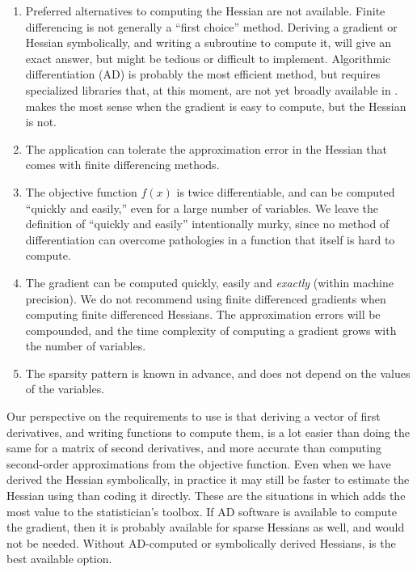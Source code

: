 \documentclass[article]{jss}\usepackage[]{graphicx}\usepackage[]{color}
\begin{document}
\begin{enumerate}
  \item Preferred alternatives to computing the Hessian are not
  available.  Finite differencing is not generally a ``first choice''
  method.  Deriving a gradient or Hessian symbolically, and writing a
  subroutine to compute it, will give an exact answer, but might be
  tedious or difficult to implement. Algorithmic differentiation (AD) is
  probably the most efficient method, but requires specialized
  libraries that, at this moment, are not yet broadly available in .
  makes the most sense when the gradient is easy to compute, but the Hessian is
  not.
  \item The application can tolerate the approximation error in the Hessian
  that comes with finite differencing methods.
\item The objective function $f(x)$ is twice differentiable, and can be
  computed ``quickly and easily,'' even for a large number of
  variables.  We leave the definition of ``quickly and easily''
  intentionally murky, since no method of differentiation can overcome
  pathologies in a function that itself is hard to compute.
\item The gradient can
  be computed quickly, easily and \emph{exactly} (within machine
  precision).   We do not recommend using finite differenced gradients
  when computing finite differenced Hessians.  The
  approximation errors will be compounded, and the time
  complexity of computing a gradient grows with the number of
  variables.
\item The sparsity pattern is known in advance, and does not depend
    on the values of the variables.
\end{enumerate}

Our perspective on the requirements to use  is
that deriving a vector of first
derivatives, and writing  functions to compute them, is a
lot easier than doing the same for a matrix of second derivatives, and
more accurate than computing second-order approximations from the
objective function. Even when we have derived the Hessian symbolically, in practice it may still be faster to estimate the Hessian
using  than coding it directly.   These are the
situations in which  adds the most value to the
statistician's toolbox.  If AD software is available to compute the gradient, then
it is probably available for sparse Hessians as well, and
 would not be needed.  Without AD-computed or
symbolically derived Hessians,  is the best
available option.
\end{document}

